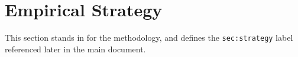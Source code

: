 \section{Empirical Strategy}
\label{sec:strategy}
This section stands in for the methodology, and defines the
\texttt{sec:strategy} label referenced later in the main document.
